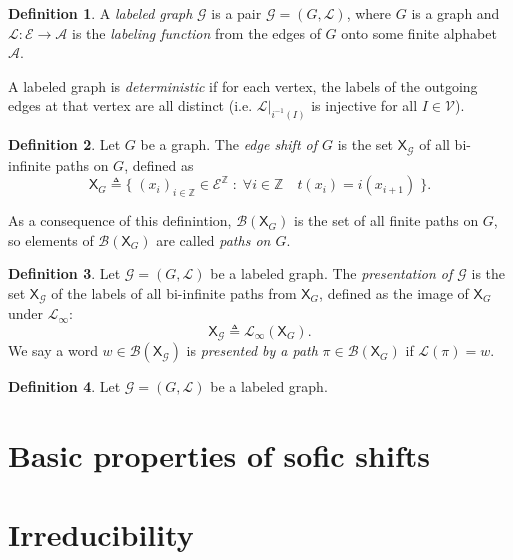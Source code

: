 \documentclass{article}
\newcommand{\Ac}{\mathcal{A}}  %
\newcommand{\Lc}{\mathcal{L}}  %
\newcommand{\Gc}{\mathcal{G}}  %
\newcommand{\Vc}{\mathcal{V}}
\newcommand{\Ec}{\mathcal{E}}
\newcommand{\Bc}{\mathcal{B}}
\newcommand{\shift}[1]{\mathsf{X}_{#1}}
\newcommand{\term}[1]{\textit{#1}}
\theoremstyle{definition}
\newtheorem{definition}{Definition}
\begin{document}
\begin{definition}
    A \term{labeled graph} \(\Gc\) is a pair \(\Gc = (G, \Lc)\), where \(G\) is a graph and \(\Lc : \Ec \to \Ac\) is the 
    \term{labeling function} from the edges of \(G\) onto some finite alphabet \(\Ac\).

    A labeled graph is \term{deterministic} if for each vertex, the labels of the outgoing edges at that vertex are all distinct 
    (i.e. \(\Lc|_{i^{-1}(I)}\) is injective for all \(I \in \Vc\)).
\end{definition}

\begin{definition}
    Let \(G\) be a graph. The \term{edge shift of \(G\)} is the set \(\shift{\Gc}\) of all bi-infinite 
    paths on \(G\), defined as 
    \[\shift{G} \triangleq \Big\{ \; (x_i)_{i \in \mathbb{Z}} \in \Ec^\mathbb{Z} \; : \; \forall i \in \mathbb{Z} \quad t(x_i) = i(x_{i+1}) \; \Big\}. \]
\end{definition}

\noindent As a consequence of this definintion, \(\Bc(\shift{G})\) is the 
set of all finite paths on \(G\), so elements of \(\Bc(\shift{G})\) are called
\term{paths on \(G\)}.


\begin{definition}
    Let \(\Gc = (G, \Lc)\) be a labeled graph. The \term{presentation of \(\Gc\)} is the set \(\shift{\Gc}\)
    of the labels of all bi-infinite paths from \(\shift{G}\), defined as the image of 
    \(\shift{G}\) under \(\Lc_\infty\): \[\shift{\Gc} \triangleq \Lc_\infty(\shift{G}).\]
    We say a word \(w \in \Bc(\shift{\Gc})\) is \term{presented by a path} \(\pi \in \Bc(\shift{G})\) if \(\Lc(\pi) = w\).
\end{definition}

\begin{definition}
    Let \(\Gc = (G, \Lc)\) be a labeled graph. 
\end{definition}

\section{Basic properties of sofic shifts}


\section{Irreducibility}
\end{document}
